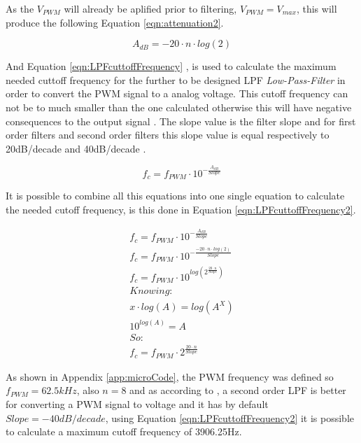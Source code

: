 		As the $V_{PWM}$ will already be aplified prior to filtering, $V_{PWM}=V_{max}$, this will produce the following Equation \ref{eqn:attenuation2}.
		
			\begin{equation}\label{eqn:attenuation}
				A_{dB}=-20 \cdot n \cdot log \left( 2 \right) 
			\end{equation}
	
		And Equation \ref{eqn:LPFcuttoffFrequency} \cite{metivier2013pwm}, is used to calculate the maximum needed cuttoff frequency for the further to be designed LPF \textit{Low-Pass-Filter} in order to convert the PWM signal to a analog voltage. This cutoff frequency can not be to much smaller than the one calculated otherwise this will have negative consequences to the output signal \cite{keim2016pwm}. The slope value is the filter slope and for first order filters and second order filters this slope value is equal respectively to 20dB/decade and 40dB/decade \cite{metivier2013pwm}.
	
			\begin{equation}\label{eqn:LPFcuttoffFrequency}
				f_{c}=f_{PWM} \cdot 10^{-\frac{A_{dB}}{Slope}}
			\end{equation}

		It is possible to combine all this equations into one single equation to calculate the needed cutoff frequency, is this done in Equation \ref{eqn:LPFcuttoffFrequency2}.

			\begin{equation}\label{eqn:LPFcuttoffFrequency2}
				\begin{split}
					f_{c}=f_{PWM} \cdot 10^{-\frac{A_{dB}}{Slope}}	\\
					f_{c}=f_{PWM} \cdot 10^{-\frac{-20 \cdot n \cdot log \left( 2 \right)}{Slope}}	\\
					f_{c}=f_{PWM} \cdot 10^{log \left( 2^{\frac{20 \cdot n }{Slope}} \right)}	\\
					Knowing:	\\
					x \cdot log \left( A \right) =  log \left( A^{X} \right) \\
					10^{log \left( A \right) } = A	\\
					So:	\\
					f_{c}=f_{PWM} \cdot  2^{\frac{20 \cdot n}{Slope}}
				\end{split}
			\end{equation}

	
		As shown in Appendix \ref{app:microCode}, the PWM frequency was defined so $f_{PWM}=62.5kHz$, also $n=8$ and as according to \cite{metivier2013pwm}, a second order LPF is better for converting a PWM signal to voltage and it has by default $Slope=-40dB/decade$, using Equation \ref{eqn:LPFcuttoffFrequency2} it is possible to calculate a maximum cutoff frequency of 3906.25Hz. 


